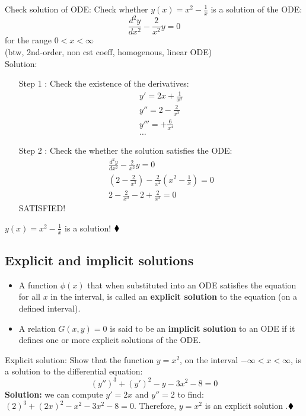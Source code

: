\begin{exmp}{Check solution of ODE:}
Check whether $y(x)=x^2-\frac{1}{x}$ is a solution of the ODE:
\begin{equation*}
\frac{d^2 y}{dx^2}-\frac{2}{x^2}y=0 
\end{equation*}
for the range $0<x< \infty$\\
(btw, 2nd-order, non cst coeff, homogenous, linear ODE)\\
Solution:
\begin{itemize}
\item[Step 1]: Check the existence of the derivatives:
\begin{eqnarray*}
y'=2x+\frac{1}{x^2}\\
y''=2-\frac{2}{x^3}\\
y'''=+\frac{6}{x^4}\\
\hdots
\end{eqnarray*}
\item[Step 2]: Check the whether the solution satisfies the ODE:
\begin{eqnarray*}
\frac{d^2 y}{dx^2}-\frac{2}{x^2}y=0 \\
\left(2-\frac{2}{x^3}\right)-\frac{2}{x^2}\left(x^2-\frac{1}{x}\right)=0 \\
2-\frac{2}{x^3}- 2+\frac{2}{x^3}=0
\end{eqnarray*}
SATISFIED!
\end{itemize}
 $y(x)=x^2-\frac{1}{x}$ is a solution! $\mathbin{\blacklozenge}$
\end{exmp}

\subsection{Explicit and implicit solutions}
\begin{itemize}
\item A function $\phi(x)$ that when substituted into an ODE satisfies the equation for all $x$ in the interval, is called an \textbf{explicit solution} to the equation (on a defined interval).
\item A relation $G(x,y)=0$ is said to be an \textbf{implicit solution} to an ODE if it defines one or more explicit solutions of the ODE.
\end{itemize}

\begin{exmp}{Explicit solution:}
Show that the function  $y=x^2$, on the interval $-\infty <x<\infty$, is a solution to the differential equation:
\begin{equation}
(y'')^3+(y')^2 -y-3x^2-8=0
\end{equation}
\textbf{Solution:} we can compute $y'=2x$ and $y''=2$ to find: $(2)^3+(2x)^2 -x^2-3x^2-8=0$. Therefore, $y=x^2$ is an explicit solution .$\mathbin{\blacklozenge}$
\end{exmp}


